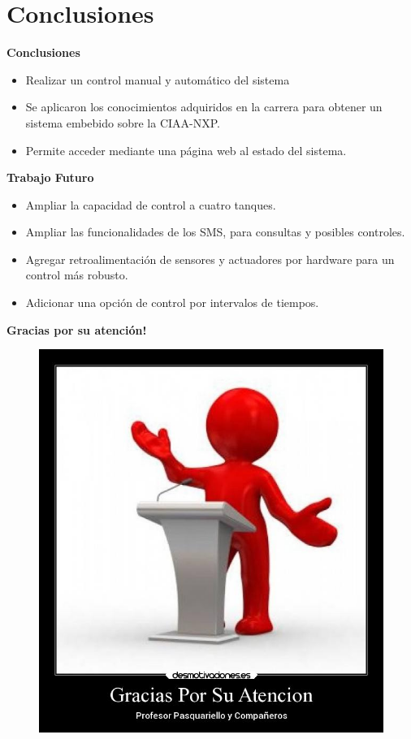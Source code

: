 \documentclass[11pt]{beamer}
\begin{document}
\section{Conclusiones}

\begin{frame}{\textbf{\LARGE{Conclusiones}}}
  \fontsize{16pt}{16}\selectfont
  \begin{itemize}
    \item Realizar un control manual y automático del sistema
      \vspace{10px}
    \item Se aplicaron los conocimientos adquiridos en la carrera para obtener un sistema embebido sobre la CIAA-NXP.
      \vspace{10px}
    \item Permite acceder mediante una página web al estado del sistema.
  \end{itemize}
\end{frame}

\begin{frame}{\textbf{\LARGE{Trabajo Futuro}}}
  \fontsize{16pt}{16}\selectfont
  \begin{itemize}
    \item Ampliar la capacidad de control a cuatro tanques.
      \vspace{15px}
    \item Ampliar las funcionalidades de los SMS, para consultas y posibles controles. 
      \vspace{15px}
    \item Agregar retroalimentación de sensores y actuadores por hardware para un control más robusto.
      \vspace{15px}
    \item Adicionar una opción de control por intervalos de tiempos. 
  \end{itemize}
\end{frame}

\begin{frame}{\textbf{\LARGE{Gracias por su atención!}}}
      \begin{figure}[H]
        {\includegraphics[width=.5\textwidth,clip,trim=2cm 5cm 3cm 2cm]{./imagenes/gracias.jpg}}
      \end{figure}	
\end{frame}
\end{document}
